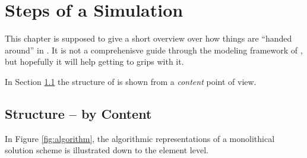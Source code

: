 \section{Steps of a \Dumux Simulation}
\label{flow}


This chapter is supposed to give a short overview over how things are ``handed around'' in \Dumux. It
is not a comprehenisve guide through the modeling framework of \Dumux, but
hopefully it will help getting to grips with it.

In Section \ref{content} the structure of \Dumux is shown from a \emph{content}
point of view.

\subsection{Structure -- by Content}

\label{content}
In Figure \ref{fig:algorithm}, the algorithmic representations of a monolithical
solution scheme is illustrated down to the element level.

